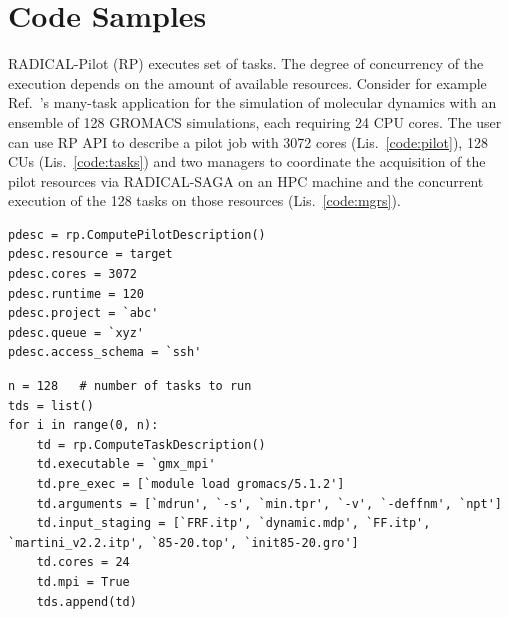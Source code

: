 \documentclass[preprint,12pt, a4paper]{elsarticle}
\begin{document}



\newpage
\appendix


\section*{Code Samples}\label{sec:metadata}

RADICAL-Pilot (RP) executes set of tasks. The degree of concurrency of the
execution depends on the amount of available resources. Consider for example
Ref.~\cite{balasubramanian2016extasy}'s many-task application for the simulation
of molecular dynamics with an ensemble of 128 GROMACS simulations, each
requiring 24 CPU cores. The user can use RP API to describe a pilot job with
3072 cores (Lis.~\ref{code:pilot}), 128 CUs (Lis.~\ref{code:tasks}) and two
managers to coordinate the acquisition of the pilot resources via RADICAL-SAGA
on an HPC machine and the concurrent execution of the 128 tasks on those
resources (Lis.~\ref{code:mgrs}).

\begin{lstlisting}
pdesc = rp.ComputePilotDescription()
pdesc.resource = target
pdesc.cores = 3072
pdesc.runtime = 120
pdesc.project = `abc'
pdesc.queue = `xyz'
pdesc.access_schema = `ssh'
\end{lstlisting}

\begin{lstlisting}
n = 128   # number of tasks to run
tds = list()
for i in range(0, n):
    td = rp.ComputeTaskDescription()
    td.executable = `gmx_mpi'
    td.pre_exec = [`module load gromacs/5.1.2']
    td.arguments = [`mdrun', `-s', `min.tpr', `-v', `-deffnm', `npt']
    td.input_staging = [`FRF.itp', `dynamic.mdp', `FF.itp', `martini_v2.2.itp', `85-20.top', `init85-20.gro']
    td.cores = 24
    td.mpi = True
    tds.append(td)
\end{lstlisting}
\end{document}
